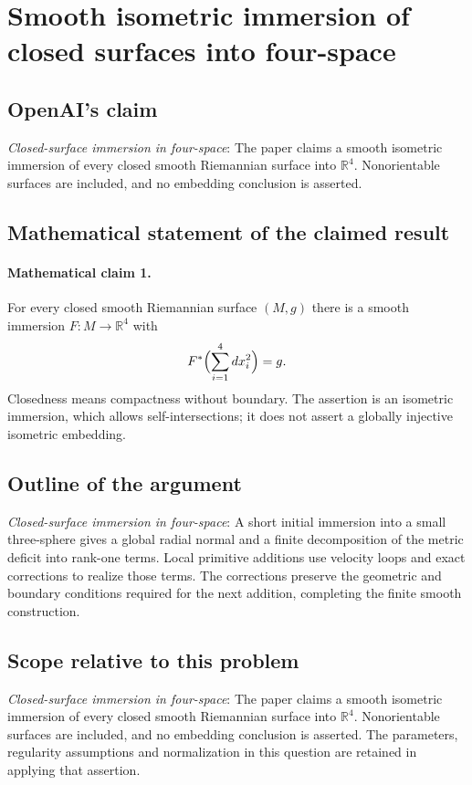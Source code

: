 \documentclass[11pt]{article}
\begin{document}
\section*{Smooth isometric immersion of closed surfaces into four-space}

\subsection{OpenAI's claim}
\textit{Closed-surface immersion in four-space}: The paper claims a smooth isometric immersion of every closed smooth Riemannian surface into $\mathbb R^4$. Nonorientable surfaces are included, and no embedding conclusion is asserted.

\subsection{Mathematical statement of the claimed result}
\paragraph{Mathematical claim 1.} For every closed smooth Riemannian surface $(M,g)$ there is a smooth immersion $F:M\to\mathbb R^4$ with \[F^*\Bigl(\sum_{i=1}^4dx_i^2\Bigr)=g.\] Closedness means compactness without boundary. The assertion is an isometric immersion, which allows self-intersections; it does not assert a globally injective isometric embedding.

\subsection{Outline of the argument}
\textit{Closed-surface immersion in four-space}: A short initial immersion into a small three-sphere gives a global radial normal and a finite decomposition of the metric deficit into rank-one terms. Local primitive additions use velocity loops and exact corrections to realize those terms. The corrections preserve the geometric and boundary conditions required for the next addition, completing the finite smooth construction.

\subsection{Scope relative to this problem}
\textit{Closed-surface immersion in four-space}: The paper claims a smooth isometric immersion of every closed smooth Riemannian surface into $\mathbb R^4$. Nonorientable surfaces are included, and no embedding conclusion is asserted. The parameters, regularity assumptions and normalization in this question are retained in applying that assertion.
\end{document}
